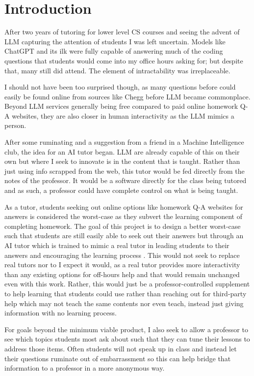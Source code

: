 \documentclass[sigconf,natbib=false]{acmart}
\begin{document}
\section{Introduction}
After two years of tutoring for lower level CS courses and seeing the advent of LLM capturing the attention of students I was left uncertain. Models like ChatGPT and its ilk were fully capable of answering much of the coding questions that students would come into my office hours asking for; but despite that, many still did attend. The element of intractability was irreplaceable.

I should not have been too surprised though, as many questions before could easily be found online from sources like Chegg before LLM became commonplace. Beyond LLM services generally being free compared to paid online homework Q-A websites, they are also closer in human interactivity as the LLM mimics a person. 

After some ruminating and a suggestion from a friend in a Machine Intelligence club, the idea for an AI tutor began. LLM are already capable of this on their own but where I seek to innovate is in the content that is taught. Rather than just using info scrapped from the web, this tutor would be fed directly from the notes of the professor. It would be a software directly for the class being tutored and as such, a professor could have complete control on what is being taught.

As a tutor, students seeking out online options like homework Q-A websites for answers is considered the worst-case as they subvert the learning component of completing homework. The goal of this project is to design a better worst-case such that students are still easily able to seek out their answers but through an AI tutor which is trained to mimic a real tutor in leading students to their answers and encouraging the learning process
.
This would not seek to replace real tutors nor to I expect it would, as a real tutor provides more interactivity than any existing options for off-hours help and that would remain unchanged even with this work. Rather, this would just be a professor-controlled supplement to help learning that students could use rather than reaching out for third-party help which may not teach the same contents nor even teach, instead just giving information with no learning process.

For goals beyond the minimum viable product, I also seek to allow a professor to see which topics students most ask about such that they can tune their lessons to address those items. Often students will not speak up in class and instead let their questions ruminate out of embarrassment so this can help bridge that information to a professor in a more anonymous way.
\end{document}
